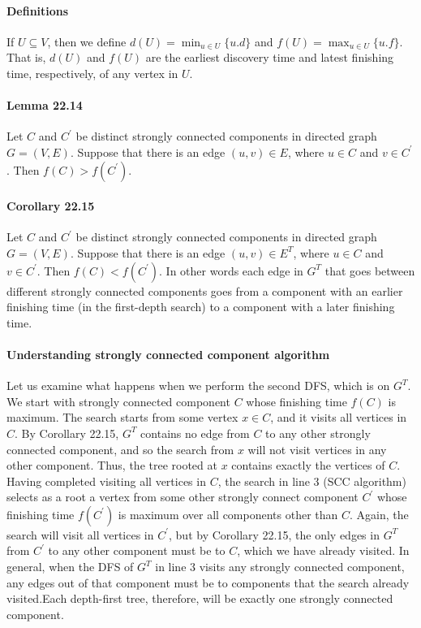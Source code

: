 \documentclass{book}
\begin{document}
	\paragraph{Definitions}If $U \subseteq V$, then we define $d(U)=\min_{u \in U}\{u.d\}$ and $f(U) = \max_{u \in U}\{u.f\}$. That is, $d(U)$ and $f(U)$ are the earliest discovery time and latest finishing time, respectively, of any vertex in $U$.
	
	\paragraph{Lemma 22.14} Let $C$ and $C^\prime$ be distinct strongly connected components in directed graph $G=(V,E)$. Suppose that there is an edge $(u, v) \in E$, where $u \in C$ and $v \in C^\prime$. Then $f(C) > f(C^\prime)$.
	
	\paragraph{Corollary 22.15} Let $C$ and $C^\prime$ be distinct strongly connected components in directed graph $G=(V,E)$. Suppose that there is an edge $(u, v) \in E^T$, where $u \in C$ and $v \in C^\prime$. Then $f(C) < f(C^\prime)$. In other words each edge in $G^T$ that goes between different strongly connected components goes from a component with an earlier finishing time (in the first-depth search) to a component with a later finishing time.
	
	\paragraph{Understanding strongly connected component algorithm} Let us examine what happens when we perform the second DFS, which is on $G^T$. We start with strongly connected component $C$ whose finishing time $f(C)$ is maximum. The search starts from some vertex $x \in C$, and it visits all vertices in $C$. By Corollary 22.15, $G^T$ contains no edge from $C$ to any other strongly connected component, and so the search from $x$ will not visit vertices in any other component. Thus, the tree rooted at $x$ contains exactly the vertices of $C$. Having completed visiting all vertices in $C$, the search in line 3 (SCC algorithm) selects as a root a vertex from some other strongly connect component $C^\prime$ whose finishing time $f(C^\prime)$ is maximum over all components other than $C$. Again, the search will visit all vertices in $C^\prime$, but by Corollary 22.15, the only edges in $G^T$ from $C^\prime$ to any other component must be to $C$, which we have already visited. In general, when the DFS of $G^T$ in line 3 visits any strongly connected component, any edges out of that component must be to components that the search already visited.Each depth-first tree, therefore, will be exactly one strongly connected component.
	
\end{document}
